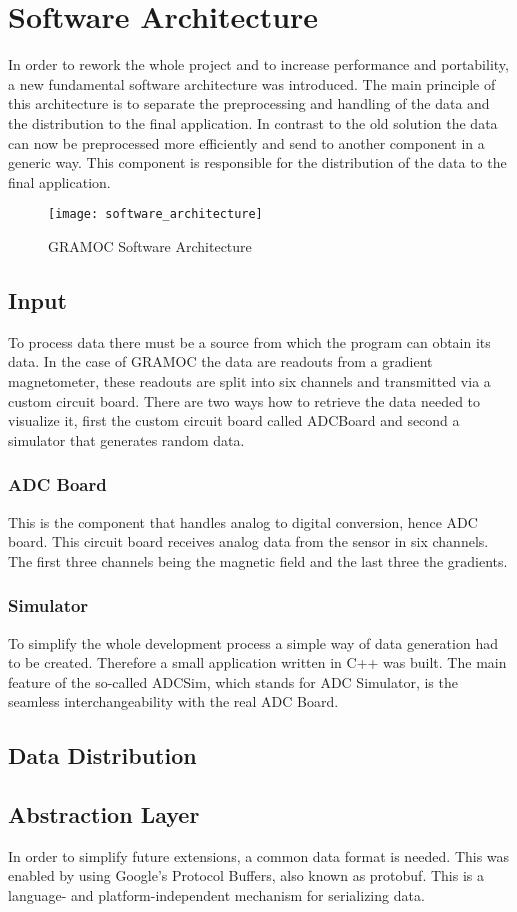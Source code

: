 \chapter{Software Architecture}
\label{ch:Software_Architecture}

In order to rework the whole project and to increase performance and portability, a new fundamental software architecture was introduced. The main principle of this architecture is to separate the preprocessing and handling of the data and the distribution to the final application. In contrast to the old solution the data can now be preprocessed more efficiently and send to another component in a generic way. This component is responsible for the distribution of the data to the final application.

\begin{figure}[H]
    \centering
    \texttt{[image: software\_architecture]}
    \caption{GRAMOC Software Architecture}
    \label{fig:software_architecture}
\end{figure}

\section{Input}

To process data there must be a source from which the program can obtain its data. In the case of GRAMOC the data are readouts from a gradient magnetometer, these readouts are split into six channels and transmitted via a custom circuit board. There are two ways how to retrieve the data needed to visualize it, first the custom circuit board called ADCBoard and second a simulator that generates random data.

\subsection{ADC Board}

This is the component that handles analog to digital conversion, hence ADC board. This circuit board receives analog data from the sensor in six channels. The first three channels being the magnetic field and the last three the gradients.

\subsection{Simulator}

To simplify the whole development process a simple way of data generation had to be created. Therefore a small application written in C++ was built. The main feature of the so-called ADCSim, which stands for ADC Simulator, is the seamless interchangeability with the real ADC Board.

\section{Data Distribution}

\section{Abstraction Layer}

In order to simplify future extensions, a common data format is needed. This was enabled by using Google's Protocol Buffers, also known as protobuf. This is a language- and platform-independent mechanism for serializing data.
